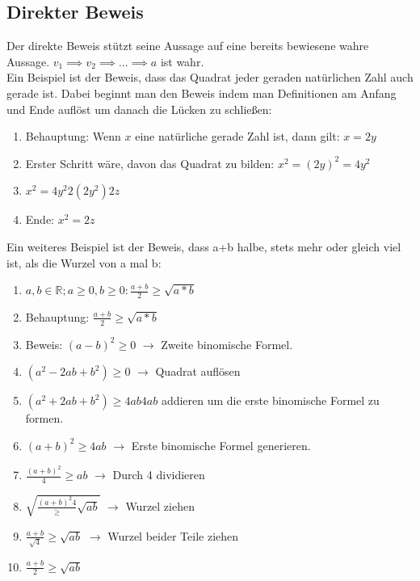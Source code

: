 \documentclass{article}
\newcommand{\R}{\mathbb{R}}
\begin{document}
	\subsection{Direkter Beweis}
	Der direkte Beweis stützt seine Aussage auf eine bereits bewiesene wahre Aussage. $v_1 \implies v_2 \implies ... \implies a$ ist wahr. \\
	Ein Beispiel ist der Beweis, dass das Quadrat jeder geraden natürlichen Zahl auch gerade ist. Dabei beginnt man den Beweis indem man Definitionen am Anfang und Ende auflöst um danach die Lücken zu schließen:
	\begin{enumerate}
		\item{Behauptung: Wenn $x$ eine natürliche gerade Zahl ist, dann gilt: $x = 2y$}
		\item{Erster Schritt wäre, davon das Quadrat zu bilden: $x^2 = (2y)^2 = 4y^2$}
		\item{$x^2 = 4y^2 $\to$ 2(2y^2) $\to$ 2z$}
		\item{Ende: $x^2 = 2z$}
	\end{enumerate}
	Ein weiteres Beispiel ist der Beweis, dass a+b halbe, stets mehr oder gleich viel ist, als die Wurzel von a mal b: \\
	\begin{enumerate}
		\item{$a,b \in\R; a \geq 0, b\geq 0: \frac{a+b}{2} \geq \sqrt{a*b}$}
		\item{Behauptung: $\frac{a+b}{2} \geq \sqrt{a*b}$}
		\item{Beweis: $(a-b)^2 \geq 0$ $\to$ Zweite binomische Formel.}
		\item{$(a^2-2ab+b^2)\geq 0$ $\to$ Quadrat auflösen}
		\item{$(a^2+2ab+b^2)\geq 4ab $\to$ 4ab$ addieren um die erste binomische Formel zu formen.}
		\item{$(a+b)^2 \geq 4ab$ $\to$ Erste binomische Formel generieren.}
		\item{$\frac{(a+b)^2}{4} \geq ab$ $\to$ Durch 4 dividieren}
		\item{$\sqrt{\frac{(a+b)^2{4}}\geq \sqrt{ab}}$ $\to$ Wurzel ziehen}
		\item{$\frac{a+b}{\sqrt{4}}\geq \sqrt{ab}$ $\to$ Wurzel beider Teile ziehen}
		\item{$\frac{a+b}{2}\geq \sqrt{ab}$}
	\end{enumerate}
\end{document}
